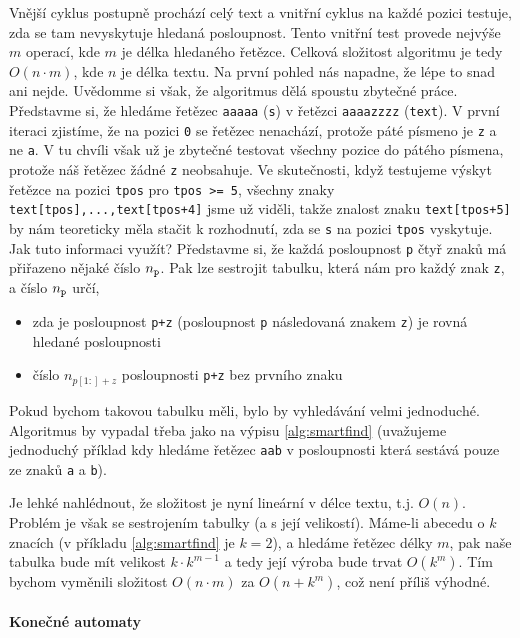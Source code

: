 Vnější cyklus postupně prochází celý text a vnitřní cyklus na každé pozici testuje, zda
se tam nevyskytuje hledaná posloupnost. Tento vnitřní test provede nejvýše \(m\) operací,
kde \(m\) je délka hledaného řetězce. Celková složitost algoritmu je tedy \(O(n\cdot m)\), 
kde \(n\) je délka textu. Na první pohled nás napadne, že lépe to snad ani nejde. 
Uvědomme si však, že algoritmus dělá spoustu zbytečné práce. Představme si, že hledáme
řetězec {\tt aaaaa} ({\tt s}) v řetězci {\tt aaaazzzz} ({\tt text}). V první iteraci zjistíme, že na pozici {\tt 0}
se řetězec nenachází, protože páté písmeno je {\tt z} a ne {\tt a}. V tu chvíli však už je
zbytečné testovat všechny pozice do pátého písmena, protože náš řetězec žádné
{\tt z} neobsahuje.  Ve skutečnosti,  když testujeme výskyt řetězce na pozici {\tt tpos}
pro {\tt tpos >= 5}, všechny znaky {\tt text[tpos],...,text[tpos+4]} jsme už viděli, takže
znalost znaku {\tt text[tpos+5]} by nám teoreticky měla stačit k rozhodnutí, zda se
{\tt s} na pozici {\tt tpos} vyskytuje. Jak tuto informaci využít? Představme si, že každá
posloupnost {\tt p} čtyř znaků má přiřazeno nějaké číslo \(n_{\tt p}\). Pak lze sestrojit
tabulku, která nám pro každý znak {\tt z}, a číslo \(n_{\tt p}\) určí, 

\begin{itemize}
 \item zda je posloupnost {\tt p+z} (posloupnost {\tt p} následovaná znakem {\tt z}) je rovná hledané posloupnosti
 \item číslo \(n_{p[1:]+z}\) posloupnosti {\tt p+z} bez prvního znaku
\end{itemize}

Pokud bychom takovou tabulku měli, bylo by vyhledávání velmi jednoduché. Algoritmus
by vypadal třeba jako na výpisu \ref{alg:smartfind} (uvažujeme jednoduchý příklad kdy
hledáme řetězec {\tt aab} v posloupnosti která sestává pouze ze znaků {\tt a} a {\tt b}).


Je lehké nahlédnout, že složitost je nyní lineární v délce textu, t.j. \(O(n)\). Problém je
však se sestrojením tabulky (a s její velikostí). Máme-li abecedu o \(k\) znacích
(v příkladu \ref{alg:smartfind} je \(k=2\)), a hledáme řetězec délky \(m\), pak naše tabulka
bude mít velikost \(k\cdot k^{m-1}\) a tedy její výroba bude trvat \(O(k^{m})\). 
Tím bychom vyměnili složitost \(O(n\cdot m)\) za \(O(n+k^{m})\), což není příliš výhodné.

\paragraph{Konečné automaty}

